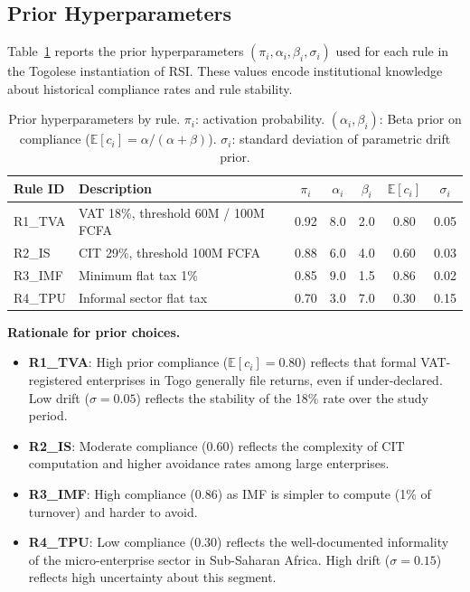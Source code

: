 \subsection{Prior Hyperparameters}

Table~\ref{tab:hyperparams} reports the prior hyperparameters
$(\pi_i, \alpha_i, \beta_i, \sigma_i)$ used for each rule in the
Togolese instantiation of RSI. These values encode institutional
knowledge about historical compliance rates and rule stability.

\begin{table}[H]
\centering
\caption{Prior hyperparameters by rule. $\pi_i$: activation probability.
$(\alpha_i, \beta_i)$: Beta prior on compliance ($\mathbb{E}[c_i] = \alpha/(\alpha+\beta)$).
$\sigma_i$: standard deviation of parametric drift prior.}
\label{tab:hyperparams}
\renewcommand{\arraystretch}{1.3}
\begin{tabular}{llccccc}
\toprule
\textbf{Rule ID} & \textbf{Description} & $\pi_i$ & $\alpha_i$ & $\beta_i$
  & $\mathbb{E}[c_i]$ & $\sigma_i$ \\
\midrule
R1\_TVA & VAT 18\%, threshold 60M / 100M FCFA & 0.92 & 8.0 & 2.0 & 0.80 & 0.05 \\
R2\_IS  & CIT 29\%, threshold 100M FCFA        & 0.88 & 6.0 & 4.0 & 0.60 & 0.03 \\
R3\_IMF & Minimum flat tax 1\%                  & 0.85 & 9.0 & 1.5 & 0.86 & 0.02 \\
R4\_TPU & Informal sector flat tax              & 0.70 & 3.0 & 7.0 & 0.30 & 0.15 \\
\bottomrule
\end{tabular}
\end{table}

\noindent\textbf{Rationale for prior choices.}
\begin{itemize}[leftmargin=2em]
  \item \textbf{R1\_TVA}: High prior compliance ($\mathbb{E}[c_i]=0.80$)
        reflects that formal VAT-registered enterprises in Togo generally
        file returns, even if under-declared. Low drift ($\sigma=0.05$)
        reflects the stability of the 18\% rate over the study period.
  \item \textbf{R2\_IS}: Moderate compliance ($0.60$) reflects the
        complexity of CIT computation and higher avoidance rates among
        large enterprises.
  \item \textbf{R3\_IMF}: High compliance ($0.86$) as IMF is simpler
        to compute (1\% of turnover) and harder to avoid.
  \item \textbf{R4\_TPU}: Low compliance ($0.30$) reflects the
        well-documented informality of the micro-enterprise sector
        in Sub-Saharan Africa. High drift ($\sigma=0.15$) reflects
        high uncertainty about this segment.
\end{itemize}

